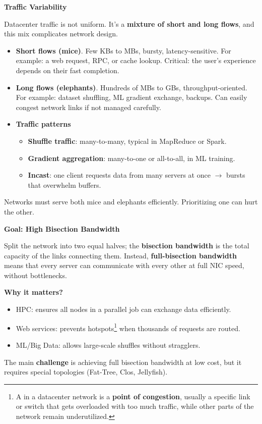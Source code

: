 \highspace
\begin{flushleft}
    \textcolor{Green3}{ \textbf{Traffic Variability}}
\end{flushleft}
Datacenter traffic is not uniform. It's a \textbf{mixture of short and long flows}, and this mix complicates network design.
\begin{itemize}
    \item \textbf{Short flows (mice)}. Few KBs to MBs, bursty, latency-sensitive. For example: a web request, RPC, or cache lookup. Critical: the user's experience depends on their fast completion.
    \item \textbf{Long flows (elephants)}. Hundreds of MBs to GBs, throughput-\break oriented. For example: dataset shuffling, ML gradient exchange, backups. Can easily congest network links if not managed carefully.
    \item \textbf{Traffic patterns}
    \begin{itemize}
        \item \textbf{Shuffle traffic}: many-to-many, typical in MapReduce or Spark.
        \item \textbf{Gradient aggregation}: many-to-one or all-to-all, in ML training.
        \item \textbf{Incast}: one client requests data from many servers at once $\rightarrow$ bursts that overwhelm buffers.
    \end{itemize}
\end{itemize}
Networks must serve both mice and elephants efficiently. Prioritizing one can hurt the other.

\newpage

\begin{flushleft}
    \textcolor{Green3}{ \textbf{Goal: High Bisection Bandwidth}}
\end{flushleft}
Split the network into two equal halves; the \textbf{bisection bandwidth} is the total capacity of the links connecting them. Instead, \textbf{full-bisection bandwidth} means that every server can communicate with every other at full NIC speed, without bottlenecks.

\highspace
\textcolor{Green3}{ \textbf{Why it matters?}}
\begin{itemize}
    \item HPC: ensures all nodes in a parallel job can exchange data efficiently.
    \item Web services: prevents hotspots\footnote{%
        A  in a datacenter network is a \textbf{point of congestion}, usually a specific link or switch that gets overloaded with too much traffic, while other parts of the network remain underutilized.
    } when thousands of requests are routed.
    \item ML/Big Data: allows large-scale shuffles without stragglers.
\end{itemize}
The main \textbf{challenge} is achieving full bisection bandwidth at low cost, but it requires special topologies (Fat-Tree, Clos, Jellyfish).

